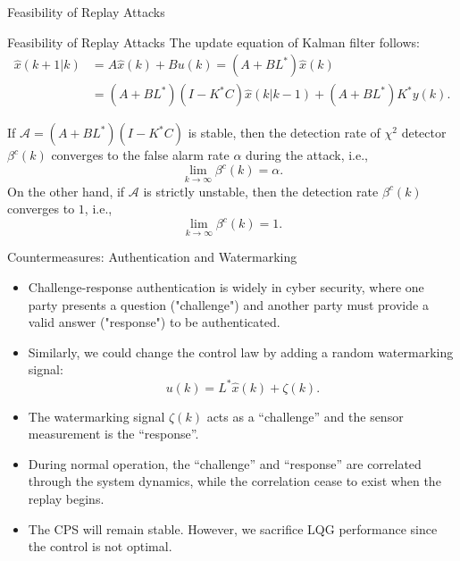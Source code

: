 \documentclass[10pt]{beamer}
\newcommand{\tikzdir}[1]{#1.tikz}
\newcommand{\inputtikz}[1]{}}
\begin{document}
  \begin{frame}{Feasibility of Replay Attacks}
    \begin{figure}[htpb]
      \begin{center}
	\inputtikz{replaydiagramthree}
      \end{center}
    \end{figure}
  \end{frame}

  \begin{frame}{Feasibility of Replay Attacks}
    The update equation of Kalman filter follows:
    \begin{align*}
      \hat{x}(k+1|k)&=A\hat{x}(k)+Bu(k)=\left(A+BL^*\right)\hat{x}(k)\\
      &=\left(A+BL^*\right)\left(I-K^*C\right)\hat{x}(k|k-1)+\left(A+BL^*\right)K^*y(k).
    \end{align*}

    \begin{theorem}
      If $\mathcal A = (A+BL^*)(I-K^*C)$ is stable, then the detection rate of $\chi^2$ detector $\beta^c(k)$ converges to the false alarm rate $\alpha$ during the attack, i.e.,
      \begin{displaymath}
	\lim_{k\rightarrow\infty}\beta^c(k) = \alpha.  
      \end{displaymath}
      On the other hand, if $\mathcal A$ is strictly unstable, then the detection rate $\beta^c(k)$ converges to $1$, i.e.,
      \begin{displaymath}
	\lim_{k\rightarrow\infty}\beta^c(k) = 1.  
      \end{displaymath}
    \end{theorem}
  \end{frame}

  \begin{frame}{Countermeasures: Authentication and Watermarking}
    \begin{itemize}
      \item Challenge-response authentication is widely in cyber security, where one party presents a question ("challenge") and another party must provide a valid answer ("response") to be authenticated.
      \item Similarly, we could change the control law by adding a random watermarking signal:
	\begin{displaymath}
	  u(k) = L^*\hat x(k) + \zeta(k).
	\end{displaymath}
      \item The watermarking signal $\zeta(k)$ acts as a ``challenge'' and the sensor measurement is the ``response''. 
      \item During normal operation, the ``challenge'' and ``response'' are correlated through the system dynamics, while the correlation cease to exist when the replay begins.
      \item The CPS will remain stable. However, we sacrifice LQG performance since the control is not optimal.
    \end{itemize}
  \end{frame}
\end{document}
